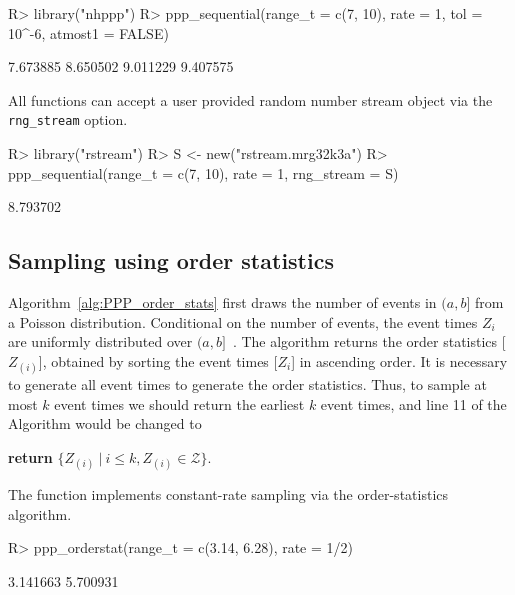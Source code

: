 \documentclass[article]{jss}\usepackage[]{graphicx}\usepackage[]{xcolor}
\newcommand{\fct}[1]{\code{#1()}}
\begin{document}
\begin{Schunk}
\begin{Sinput}
R> library("nhppp")
R> ppp_sequential(range_t = c(7, 10), rate = 1, tol = 10^-6, atmost1 = FALSE)
\end{Sinput}
\begin{Soutput}
[1] 7.673885 8.650502 9.011229 9.407575
\end{Soutput}
\end{Schunk}

All  functions can accept a user provided random number stream object via the \texttt{rng\_stream} option.

\begin{Schunk}
\begin{Sinput}
R> library("rstream")
R> S <- new("rstream.mrg32k3a")
R> ppp_sequential(range_t = c(7, 10), rate = 1, rng_stream = S)
\end{Sinput}
\begin{Soutput}
[1] 8.793702
\end{Soutput}
\end{Schunk}


\subsection{Sampling using order statistics}\label{sec:PPP_order_stats}


Algorithm~\ref{alg:PPP_order_stats} first draws the number of events in $(a, b]$ from a Poisson distribution. Conditional on the number of events, the event times $Z_i$ are uniformly distributed over $(a, b]$~\citep[par. 4.1]{cox1965theory}. The algorithm returns the order statistics [$Z_{(i)}$], obtained by sorting the event times [$Z_i$] in ascending order. It is necessary to generate all event times to generate the order statistics. Thus, to sample at most $k$ event times we should return the earliest $k$ event times, and line 11 of the Algorithm would be changed to
\begin{center}
\textbf{return} {$\{Z_{(i)} \ | \ i \le k, Z_{(i)} \in \mathcal{Z}\}$}.
\end{center}


The \fct{ppp\_orderstat} function implements constant-rate sampling via the order-statistics algorithm.

\begin{Schunk}
\begin{Sinput}
R> ppp_orderstat(range_t = c(3.14, 6.28), rate = 1/2)
\end{Sinput}
\begin{Soutput}
[1] 3.141663 5.700931
\end{Soutput}
\end{Schunk}
\end{document}
